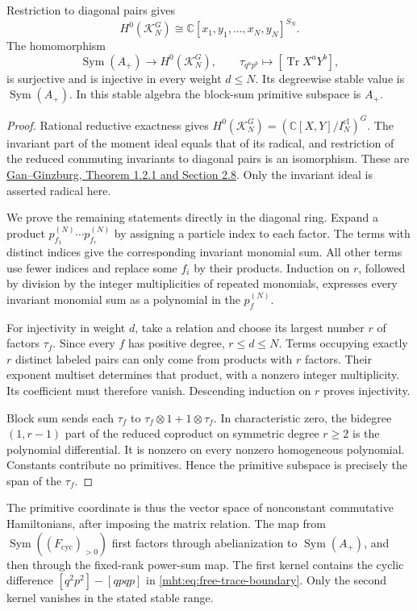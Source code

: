 \begin{proposition}\label{mht:prop:commuting-traces}
Restriction to diagonal pairs gives
\[
 H^0(\mathcal K_N^G)
 \cong\mathbb C[x_1,y_1,\ldots,x_N,y_N]^{S_N}.
\]
The homomorphism
\[
 \operatorname{Sym}(A_+)\longrightarrow H^0(\mathcal K_N^G),
 \qquad \tau_{q^ap^b}\longmapsto[\operatorname{Tr}X^aY^b],
\]
is surjective and is injective in every weight $d\leq N$.
Its degreewise stable value is $\operatorname{Sym}(A_+)$.
In this stable algebra the block-sum primitive subspace is $A_+$.
\end{proposition}
\begin{proof}
Rational reductive exactness gives
$H^0(\mathcal K_N^G)=(\mathbb C[X,Y]/I_N^{\mathrm{cl}})^G$.
The invariant part of the moment ideal equals that of its radical,
and restriction of the reduced commuting invariants to diagonal
pairs is an isomorphism. These are
\href{https://arxiv.org/abs/math/0409262}
{Gan--Ginzburg, Theorem 1.2.1 and Section 2.8}.
Only the invariant ideal is asserted radical here.

We prove the remaining statements directly in the diagonal ring.
Expand a product $p_{f_1}^{(N)}\cdots p_{f_r}^{(N)}$ by assigning
a particle index to each factor. The terms with distinct indices
give the corresponding invariant monomial sum. All other terms
use fewer indices and replace some $f_i$ by their products.
Induction on $r$, followed by division by the integer
multiplicities of repeated monomials, expresses every invariant
monomial sum as a polynomial in the $p_f^{(N)}$.

For injectivity in weight $d$, take a relation and choose its
largest number $r$ of factors $\tau_f$. Since every $f$ has
positive degree, $r\leq d\leq N$. Terms occupying exactly $r$
distinct labeled pairs can only come from products with $r$
factors. Their exponent multiset determines that product, with a
nonzero integer multiplicity. Its coefficient must therefore
vanish. Descending induction on $r$ proves injectivity.

Block sum sends each $\tau_f$ to
$\tau_f\otimes1+1\otimes\tau_f$.
In characteristic zero, the bidegree $(1,r-1)$ part of the
reduced coproduct on symmetric degree $r\geq2$ is the polynomial
differential. It is nonzero on every nonzero homogeneous
polynomial. Constants contribute no primitives. Hence the
primitive subspace is precisely the span of the $\tau_f$.
\end{proof}

The primitive coordinate is thus the vector space of nonconstant
commutative Hamiltonians, after imposing the matrix relation.
The map from $\operatorname{Sym}((F_{\mathrm{cyc}})_{>0})$
first factors through abelianization to
$\operatorname{Sym}(A_+)$, and then through the fixed-rank
power-sum map. The first kernel contains the cyclic difference
$[q^2p^2]-[qpqp]$ in \eqref{mht:eq:free-trace-boundary}.
Only the second kernel vanishes in the stated stable range.

